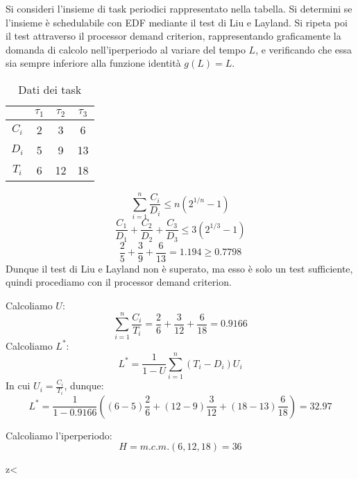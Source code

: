 \begin{Esercizio7}

Si consideri l'insieme di task periodici rappresentato nella tabella.  
Si determini se l'insieme è schedulabile con EDF mediante il test di Liu e Layland.  
Si ripeta poi il test attraverso il processor demand criterion, 
rappresentando graficamente la domanda di calcolo nell'iperperiodo
al variare del tempo $L$, e verificando che essa sia sempre inferiore 
alla funzione identità $g(L)=L$.

\begin{table}[H]
\centering
\caption{Dati dei task}
\begin{tabular}{|c|c|c|c|}
\hline
 & $\tau_1$ & $\tau_2$ & $\tau_3$ \\
\hline
$C_i$ & 2 & 3 & 6 \\
\hline
$D_i$ & 5 & 9 & 13 \\
\hline
$T_i$ & 6 & 12 & 18 \\
\hline
\end{tabular}
\label{tab:edf_tasks}
\end{table}


\[ 
\sum_{i=1}^{n} \frac{C_{i}}{D_{i}} \le n (2^{1/n} - 1)
\]
\[ \frac{C_{1}}{D_{1}} + \frac{C_{2}}{D_{2}} + \frac{C_{3}}{D_{3}} \le 3 (2^{1/3} - 1) \]
\[ \frac{2}{5} + \frac{3}{9} + \frac{6}{13} = 1.194 \ge 0.7798 \]
Dunque il test di Liu e Layland non è superato, ma esso è solo un test sufficiente,
quindi procediamo con il processor demand criterion.

Calcoliamo \(U\):
\[
\sum_{i=1}^{n} \frac{C_{i}}{T_{i}} = \frac{2}{6} + \frac{3}{12} + \frac{6}{18} = 0.9166  
\]
Calcoliamo \(L^{*}\):
\[
L^{*} = \frac{1}{1-U}\sum_{i=1}^{n} (T_{i} - D_{i}) U_{i} 
\]
In cui \(U_{i} = \displaystyle \frac{C_{i}}{T_{i}}\), dunque:
\[
L^{*} = \frac{1}{1-0.9166} 
\left( (6-5) \frac{2}{6} + (12-9) \frac{3}{12} + (18-13) \frac{6}{18} \right) = 32.97
\]

Calcoliamo l'iperperiodo:
\[ H = m.c.m.(6, 12, 18) = 36 \]


z<
\begin{figure}[h]
\centering
{}
\end{figure}

\end{Esercizio7}



